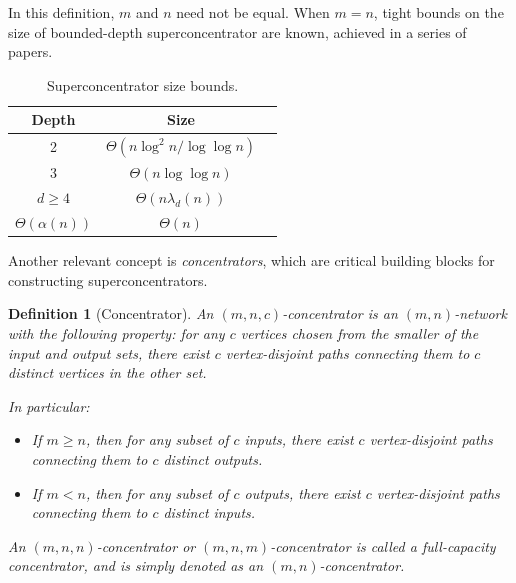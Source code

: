 \documentclass[11pt]{article}
\newtheorem{definition}{Definition}
\begin{document}
In this definition, $m$ and $n$ need not be equal.
When $m = n$, tight bounds on the size of bounded-depth superconcentrator are known, achieved in a series of papers. 

\begin{table}[h!]
\begin{center}
\begin{tabular}{ |c|c|c| } 
\hline
Depth & Size  \\
\hline
2 & $\Theta(n \log^2 n / \log\log n)$ \cite{AP94, RT00}  \\ 
3 & $\Theta(n \log\log n)$ \cite{AP94} \\ 
$d \ge 4$ & $\Theta(n \lambda_d(n))$ \cite{DDPW83, Pud94}  \\ 
$\Theta(\alpha(n))$ & $\Theta(n)$ \cite{DDPW83}  \\ 
\hline
\end{tabular}
\caption{Superconcentrator size bounds.}
\label{table:sc_bounds}
\end{center}
\end{table}

Another relevant concept is \emph{concentrators}, which are critical building blocks for constructing superconcentrators.

\begin{definition}[Concentrator]
\label{def:concentrator}
An \emph{$(m, n, c)$-concentrator} is an $(m, n)$-network with the following property:  for any $c$  vertices chosen from the smaller of the input and output sets, there exist $c$ vertex-disjoint paths connecting them to  $c$ distinct vertices in the other set.

In particular:
\begin{itemize}
    \item If $m \ge n$, then for any subset of $c$ inputs, there exist $c$ vertex-disjoint paths connecting them to $c$ distinct outputs.
    \item If $m < n$, then for any subset of $c$ outputs, there exist $c$ vertex-disjoint paths connecting them to $c$ distinct inputs.
\end{itemize}

An $(m, n, n)$-concentrator or $(m, n, m)$-concentrator is called a \emph{full-capacity concentrator}, and is simply denoted as an $(m, n)$-concentrator.
\end{definition}
\end{document}
